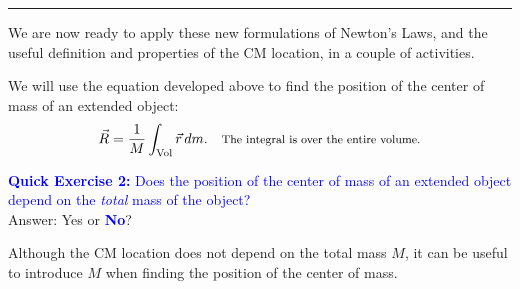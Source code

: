 \documentclass[11pt, letterpaper, openany]{book}
\begin{document}
\vspace{0.5em}\hrule\vspace{0.5em}

We are now ready to apply these new formulations of Newton's Laws, and the useful definition and properties of the CM location, in a couple of activities.

We will use the equation developed above to find the position of the center of mass of an extended object:
\[ \vec{R} = \frac{1}{M}\int_{\text{Vol}} \vec{r}\,dm. \quad \text{\footnotesize{The integral is over the entire volume.}} \]

\textcolor{blue}{\textbf{Quick Exercise 2:} Does the position of the center of mass of an extended object depend on the \textit{total} mass of the object?} \\
Answer: Yes or \textbf{\textcolor{blue}{No}}?

Although the CM location does not depend on the total mass $M$, it can be useful to introduce $M$ when finding the position of the center of mass.
\end{document}
